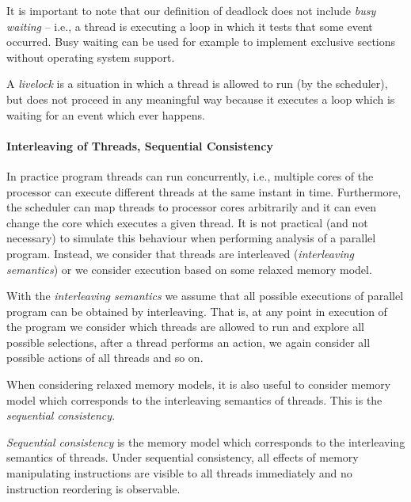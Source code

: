 It is important to note that our definition of deadlock does not include
\emph{busy waiting} -- i.e., a thread is executing a loop in which it tests
that some event occurred.
Busy waiting can be used for example to implement exclusive sections without
operating system support.

\begin{definition}[Livelock]\label{def:livelock}
    A \emph{livelock} is a situation in which a thread is allowed to run (by
    the scheduler), but does not proceed in any meaningful way because it
    executes a loop which is waiting for an event which ever happens.
\end{definition}

\paragraph{Interleaving of Threads, Sequential Consistency}

In practice program threads can run concurrently, i.e., multiple cores of the
processor can execute different threads at the same instant in time.
Furthermore, the scheduler can map threads to processor cores arbitrarily and
it can even change the core which executes a given thread.
It is not practical (and not necessary) to simulate this behaviour when
performing analysis of a parallel program.
Instead, we consider that threads are interleaved (\emph{interleaving
semantics}) or we consider execution based on some relaxed memory model.

\begin{definition}
    With the \emph{interleaving semantics} we assume that all possible
    executions of parallel program can be obtained by interleaving.
    That is, at any point in execution of the program we consider which threads
    are allowed to run and explore all possible selections, after a thread
    performs an action, we again consider all possible actions of all threads
    and so on.
\end{definition}

When considering relaxed memory models, it is also useful to consider memory
model which corresponds to the interleaving semantics of threads.
This is the \emph{sequential consistency}.

\begin{definition}
    \emph{Sequential consistency} is the memory model which corresponds to the
    interleaving semantics of threads.
    Under sequential consistency, all effects of memory manipulating
    instructions are visible to all threads immediately and no instruction
    reordering is observable.
\end{definition}

